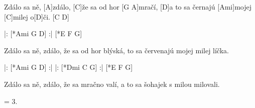 
\sloka
[D]Zdálo sa ně, [A]zdálo,
[C]že sa od hor [G A]mračí,
[D]a to sa černajú [Ami]mojej [C]milej o[D]či. [C D]

|: [*Ami G D] :| [*E F G]

\sloka
Zdálo sa ně, zdálo,
že sa od hor blýská,
to sa červenajú mojej milej líčka.

|: [*Ami G D] :|
|: [*Dmi C G] :| [*E F G]

\sloka
Zdálo sa ně, zdálo,
že sa mračno valí,
a to sa šohajek s milou milovali.

\sloka
= 3.
